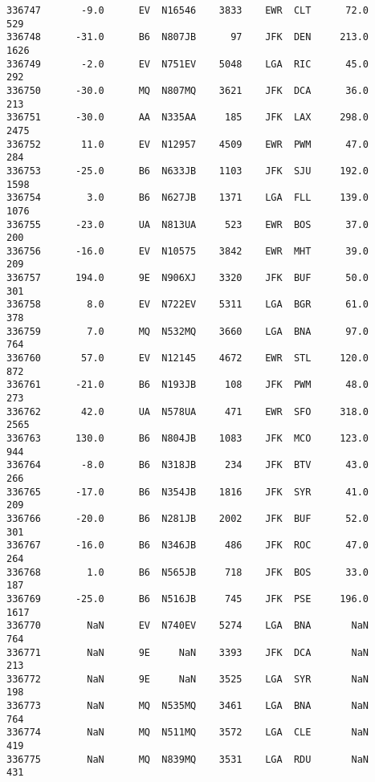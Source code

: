 \documentclass[11pt]{article}
\begin{document}
\begin{Verbatim}[commandchars=\\\{\}]
336747       -9.0      EV  N16546    3833    EWR  CLT      72.0       529   
336748      -31.0      B6  N807JB      97    JFK  DEN     213.0      1626   
336749       -2.0      EV  N751EV    5048    LGA  RIC      45.0       292   
336750      -30.0      MQ  N807MQ    3621    JFK  DCA      36.0       213   
336751      -30.0      AA  N335AA     185    JFK  LAX     298.0      2475   
336752       11.0      EV  N12957    4509    EWR  PWM      47.0       284   
336753      -25.0      B6  N633JB    1103    JFK  SJU     192.0      1598   
336754        3.0      B6  N627JB    1371    LGA  FLL     139.0      1076   
336755      -23.0      UA  N813UA     523    EWR  BOS      37.0       200   
336756      -16.0      EV  N10575    3842    EWR  MHT      39.0       209   
336757      194.0      9E  N906XJ    3320    JFK  BUF      50.0       301   
336758        8.0      EV  N722EV    5311    LGA  BGR      61.0       378   
336759        7.0      MQ  N532MQ    3660    LGA  BNA      97.0       764   
336760       57.0      EV  N12145    4672    EWR  STL     120.0       872   
336761      -21.0      B6  N193JB     108    JFK  PWM      48.0       273   
336762       42.0      UA  N578UA     471    EWR  SFO     318.0      2565   
336763      130.0      B6  N804JB    1083    JFK  MCO     123.0       944   
336764       -8.0      B6  N318JB     234    JFK  BTV      43.0       266   
336765      -17.0      B6  N354JB    1816    JFK  SYR      41.0       209   
336766      -20.0      B6  N281JB    2002    JFK  BUF      52.0       301   
336767      -16.0      B6  N346JB     486    JFK  ROC      47.0       264   
336768        1.0      B6  N565JB     718    JFK  BOS      33.0       187   
336769      -25.0      B6  N516JB     745    JFK  PSE     196.0      1617   
336770        NaN      EV  N740EV    5274    LGA  BNA       NaN       764   
336771        NaN      9E     NaN    3393    JFK  DCA       NaN       213   
336772        NaN      9E     NaN    3525    LGA  SYR       NaN       198   
336773        NaN      MQ  N535MQ    3461    LGA  BNA       NaN       764   
336774        NaN      MQ  N511MQ    3572    LGA  CLE       NaN       419   
336775        NaN      MQ  N839MQ    3531    LGA  RDU       NaN       431   


\end{Verbatim}
\end{document}
